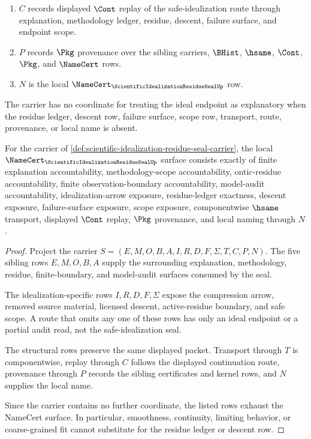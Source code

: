 \begin{definition}
\begin{enumerate}
\item $C$ records displayed $\Cont$ replay of the safe-idealization route through explanation, methodology ledger, residue, descent, failure surface, and endpoint scope.
\item $P$ records $\Pkg$ provenance over the sibling carriers, $\BHist$, $\hsame$, $\Cont$, $\Pkg$, and $\NameCert$ rows.
\item $N$ is the local $\NameCert_{\ScientificIdealizationResidueSealUp}$ row.
\end{enumerate}
The carrier has no coordinate for treating the ideal endpoint as explanatory when the residue ledger, descent row, failure surface, scope row, transport, route, provenance, or local name is absent.
\end{definition}

\begin{theorem}
\label{thm:scientific-idealization-residue-seal-namecert-obligations}
For the carrier of \autoref{def:scientific-idealization-residue-seal-carrier}, the local $\NameCert_{\ScientificIdealizationResidueSealUp}$ surface consists exactly of finite explanation accountability, methodology-scope accountability, ontic-residue accountability, finite observation-boundary accountability, model-audit accountability, idealization-arrow exposure, residue-ledger exactness, descent exposure, failure-surface exposure, scope exposure, componentwise $\hsame$ transport, displayed $\Cont$ replay, $\Pkg$ provenance, and local naming through $N$.
\end{theorem}
\begin{proof}
Project the carrier $S=(E,M,O,B,A,I,R,D,F,\Sigma,T,C,P,N)$. The five sibling rows $E,M,O,B,A$ supply the surrounding explanation, methodology, residue, finite-boundary, and model-audit surfaces consumed by the seal.

The idealization-specific rows $I,R,D,F,\Sigma$ expose the compression arrow, removed source material, licensed descent, active-residue boundary, and safe scope. A route that omits any one of these rows has only an ideal endpoint or a partial audit read, not the safe-idealization seal.

The structural rows preserve the same displayed packet. Transport through $T$ is componentwise, replay through $C$ follows the displayed continuation route, provenance through $P$ records the sibling certificates and kernel rows, and $N$ supplies the local name.

Since the carrier contains no further coordinate, the listed rows exhaust the NameCert surface. In particular, smoothness, continuity, limiting behavior, or coarse-grained fit cannot substitute for the residue ledger or descent row.
\end{proof}

